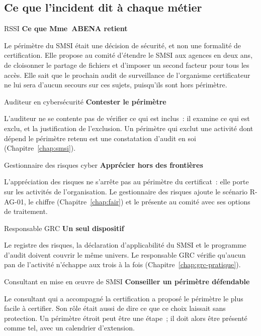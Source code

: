 \subsection{Ce que l'incident dit à chaque métier}

\begin{boxmetier}{RSSI}
\textbf{Ce que Mme~ABENA retient}

Le périmètre du SMSI était une décision de sécurité, et non une formalité
de certification. Elle propose au comité d'étendre le SMSI aux agences en
deux ans, de cloisonner le partage de fichiers et d'imposer un second
facteur pour tous les accès. Elle sait que le prochain audit de
surveillance de l'organisme certificateur ne lui sera d'aucun secours sur
ces sujets, puisqu'ils sont hors périmètre.
\end{boxmetier}

\begin{boxmetier}{Auditeur en cybersécurité}
\textbf{Contester le périmètre}

L'auditeur ne se contente pas de vérifier ce qui est inclus~: il examine
ce qui est exclu, et la justification de l'exclusion. Un périmètre qui
exclut une activité dont dépend le périmètre retenu est une constatation
d'audit en soi (Chapitre~\ref{chap:smsi}).
\end{boxmetier}

\begin{boxmetier}{Gestionnaire des risques cyber}
\textbf{Apprécier hors des frontières}

L'appréciation des risques ne s'arrête pas au périmètre du certificat~: elle
porte sur les activités de l'organisation. Le gestionnaire des risques ajoute
le scénario R-AG-01, le chiffre (Chapitre~\ref{chap:fair}) et le présente
au comité avec ses options de traitement.
\end{boxmetier}

\begin{boxmetier}{Responsable GRC}
\textbf{Un seul dispositif}

Le registre des risques, la déclaration d'applicabilité du SMSI et le
programme d'audit doivent couvrir le même univers. Le responsable GRC
vérifie qu'aucun pan de l'activité n'échappe aux trois à la fois
(Chapitre~\ref{chap:grc-pratique}).
\end{boxmetier}

\begin{boxmetier}{Consultant en mise en œuvre de SMSI}
\textbf{Conseiller un périmètre défendable}

Le consultant qui a accompagné la certification a proposé le périmètre le
plus facile à certifier. Son rôle était aussi de dire ce que ce choix
laissait sans protection. Un périmètre étroit peut être une étape~; il doit
alors être présenté comme tel, avec un calendrier d'extension.
\end{boxmetier}

